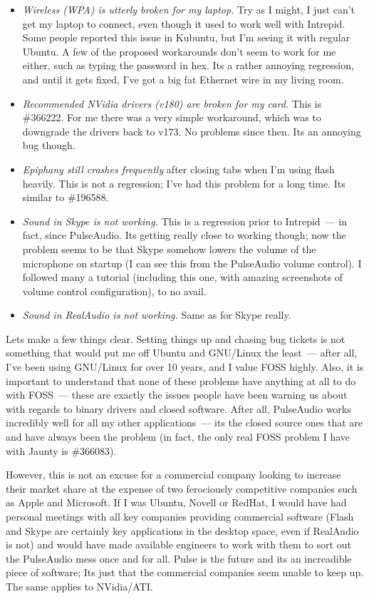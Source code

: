 \documentclass{memoir}
\begin{document}
\begin{itemize}
\item \emph{Wireless (WPA) is utterly broken for my laptop.} Try as I
  might, I just can't get my laptop to connect, even though it used to
  work well with Intrepid. Some people reported this issue in Kubuntu,
  but I'm seeing it with regular Ubuntu. A few of the proposed
  workarounds don't seem to work for me either, such as typing the
  password in hex. Its a rather annoying regression, and until it gets
  fixed, I've got a big fat Ethernet wire in my living room.
\item \emph{Recommended NVidia drivers (v180) are broken for my card.}
  This is \#366222. For me there was a very simple workaround, which
  was to downgrade the drivers back to v173. No problems since
  then. Its an annoying bug though.
\item \emph{Epiphany still crashes frequently} after closing tabs when
  I'm using flash heavily. This is not a regression; I've had this
  problem for a long time. Its similar to \#196588.
\item \emph{Sound in Skype is not working.} This is a regression prior
  to Intrepid~--- in fact, since PulseAudio. Its getting really close to
  working though; now the problem seems to be that Skype somehow
  lowers the volume of the microphone on startup (I can see this from
  the PulseAudio volume control). I followed many a tutorial
  (including this one, with amazing screenshots of volume control
  configuration), to no avail.
\item \emph{Sound in RealAudio is not working.} Same as for Skype
  really.
\end{itemize}

Lets make a few things clear. Setting things up and chasing bug
tickets is not something that would put me off Ubuntu and GNU/Linux
the least~--- after all, I've been using GNU/Linux for over 10 years,
and I value FOSS highly. Also, it is important to understand that none
of these problems have anything at all to do with FOSS~--- these are
exactly the issues people have been warning us about with regards to
binary drivers and closed software. After all, PulseAudio works
incredibly well for all my other applications~--- its the closed
source ones that are and have always been the problem (in fact, the
only real FOSS problem I have with Jaunty is \#366083).

However, this is not an excuse for a commercial company looking to
increase their market share at the expense of two ferociously
competitive companies such as Apple and Microsoft. If I was Ubuntu,
Novell or RedHat, I would have had personal meetings with all key
companies providing commercial software (Flash and Skype are certainly
key applications in the desktop space, even if RealAudio is not) and
would have made available engineers to work with them to sort out the
PulseAudio mess once and for all. Pulse is the future and its an
increadible piece of software; Its just that the commercial companies
seem unable to keep up. The same applies to NVidia/ATI.
\end{document}

